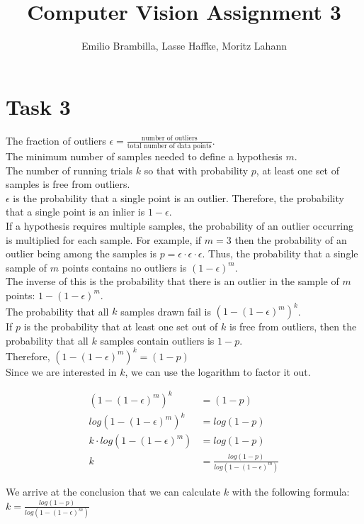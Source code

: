 \documentclass{article}
\title{Computer Vision Assignment 3}
\author{Emilio Brambilla, Lasse Haffke, Moritz Lahann}
\begin{document}
\maketitle

\section{Task 3} 

The fraction of outliers $\epsilon = \frac{\text{number of outliers}}{\text{total number of data points}}$.\\

The minimum number of samples needed to define a hypothesis $m$.\\

The number of running trials $k$ so that with probability $p$, at least one set of samples is free from outliers.\\

$\epsilon$ is the probability that a single point is an outlier. Therefore, the probability that a single point is an inlier is $1 - \epsilon$.\\

If a hypothesis requires multiple samples, the probability of an outlier occurring is multiplied for each sample. For example, if $m = 3$ then the probability of an outlier being among the samples is  $p = \epsilon \cdot \epsilon \cdot \epsilon$. Thus, the probability that a single sample of $m$ points contains no outliers is $(1 - \epsilon)^m$.\\

The inverse of this is the probability that there is an outlier in the sample of $m$ points:  $1 - (1 - \epsilon)^m$.\\

The probability that all $k$ samples drawn fail is $(1 - (1 - \epsilon)^m)^k$. \\

If $p$ is the probability that at least one set out of $k$ is free from outliers, then the probability that all $k$ samples contain outliers is $1 - p$. \\

Therefore, $(1 - (1 - \epsilon)^m)^k = (1 - p)$ \\

Since we are interested in $k$, we can use the logarithm to factor it out.

\begin{align}
(1 - (1 - \epsilon)^m)^k &= (1 - p) \\
log (1 - (1 - \epsilon)^m)^k &= log (1 - p)\\
k \cdot log (1 - (1 - \epsilon)^m) &= log (1 - p)\\
k &= \frac{log (1 - p)}{log (1 - (1 - \epsilon)^m)}
\end{align}

We arrive at the conclusion that we can calculate $k$ with the following formula: $k = \frac{log (1 - p)}{log (1 - (1 - \epsilon)^m)}$
\end{document}
